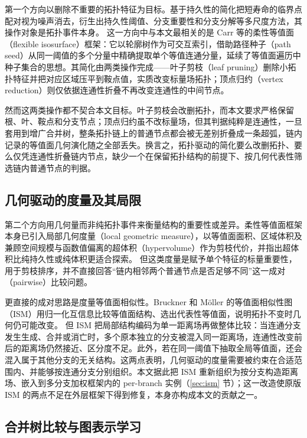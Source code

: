 \documentclass[twocolumn, a4paper, 10pt]{article}
\begin{document}
第一个方向以删除不重要的拓扑特征为目标。基于持久性的简化把短寿命的临界点配对视为噪声消去，衍生出持久性阈值、分支重要性和分支分解等多尺度方法，其操作对象是拓扑事件本身。\cite{edelsbrunner_persistence_2002,carr_geometric_2004} 这一方向中与本文最相关的是 Carr 等的柔性等值面（flexible isosurface）框架\cite{carr_flexible_2010}：它以轮廓树作为可交互索引\cite{carr_contour_2003}，借助路径种子（path seed）从同一阈值的多个分量中精确提取单个等值连通分量，延续了等值面遍历中种子集合的思想\cite{van_kreveld_1997}。其简化由两类操作完成——叶子剪枝（leaf pruning）删除小拓扑特征并把对应区域压平到鞍点值，实质改变标量场拓扑；顶点归约（vertex reduction）则仅依据连通性折叠不再改变连通性的中间节点。

然而这两类操作都不契合本文目标。叶子剪枝会改删拓扑，而本文要求严格保留根、叶、鞍点和分支节点；顶点归约虽不改标量场，但其判据纯粹是连通性，一旦套用到增广合并树，整条拓扑链上的普通节点都会被无差别折叠成一条超弧，链内记录的等值面几何演化随之全部丢失。换言之，拓扑驱动的简化要么改删拓扑、要么仅凭连通性折叠链内节点，缺少一个在保留拓扑结构的前提下、按几何代表性筛选链内普通节点的判据。

\subsection{几何驱动的度量及其局限}

第二个方向用几何量而非纯拓扑事件来衡量结构的重要性或差异。柔性等值面框架本身已引入局部几何度量（local geometric measure），以等值面面积、区域体积及兼顾空间规模与函数值偏离的超体积（hypervolume）作为剪枝代价，并指出超体积比纯持久性或纯体积更适合探索。\cite{carr_geometric_2004,carr_flexible_2010} 但这类度量是赋予单个特征的标量重要性，用于剪枝排序，并不直接回答“链内相邻两个普通节点是否足够不同”这一成对（pairwise）比较问题。

更直接的成对思路是度量等值面相似性。Bruckner 和 Möller 的等值面相似性图（ISM）用归一化互信息比较等值面结构、选出代表性等值面，说明拓扑不变时几何仍可能改变。\cite{bruckner_ism_2010} 但 ISM 把局部结构编码为单一距离场再做整体比较：当连通分支发生生成、合并或消亡时，多个原本独立的分支被混入同一距离场，连通性改变前后的距离场仍然接近、区分度不足。此外，若在同一阈值下抽取全局等值面，还会混入属于其他分支的无关结构。这两点表明，几何驱动的度量需要被约束在合适范围内、并能够按连通分支分别组织。本文据此把 ISM 重新组织为按分支构造距离场、嵌入到多分支加权框架内的 per-branch 实例（\ref{sec:ism} 节）；这一改造使原版 ISM 的两点不足在外层框架下得到修复，本身亦构成本文的贡献之一。

\subsection{合并树比较与图表示学习}
\end{document}
